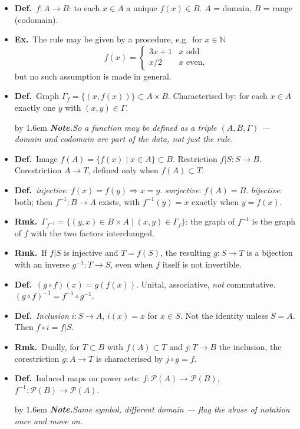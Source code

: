 \documentclass[12pt,a4paper]{article}
\newcommand{\Dfn}{\textbf{Def.}~}
\newcommand{\Exa}{\textbf{Ex.}~}
\newcommand{\Rmk}{\textbf{Rmk.}~}
\newcommand{\Cue}[1]{%
  \par\addvspace{7pt}\nopagebreak
  \begingroup
    \advance\leftskip by 1.6em
    \parindent=0pt \small\color{cue}%
    \textbf{\textit{Note.}}\enspace \textit{#1}\par
  \endgroup
  \addvspace{9pt}}
\newenvironment{BL}%
  {\begin{itemize}[leftmargin=1.4em,labelsep=0.55em,itemsep=11pt,topsep=11pt,parsep=0pt]}%
  {\end{itemize}}
\newcommand{\NN}{\mathbb{N}}
\newcommand{\Pow}{\mathcal{P}}
\newcommand{\imp}{\Rightarrow}
\begin{document}
\begin{BL}
\item \Dfn $f\colon A\to B$: to each $x\in A$ a unique $f(x)\in B$.
      $A$ = domain, $B$ = range (codomain).
\item \Exa The rule may be given by a procedure, e.g.\ for $x\in\NN$
      \[ f(x)=\begin{cases}3x+1 & x\text{ odd}\\ x/2 & x\text{ even,}\end{cases} \]
      but no such assumption is made in general.
\item \Dfn Graph $\Gamma_f=\{(x,f(x))\}\subset A\times B$.
      Characterised by: for each $x\in A$ exactly one $y$ with $(x,y)\in\Gamma$.
\Cue{So a function may be \emph{defined} as a triple $(A,B,\Gamma)$ --- domain and codomain are
part of the data, not just the rule.}
\item \Dfn Image $f(A)=\{f(x)\mid x\in A\}\subset B$.\quad
      Restriction $f|S\colon S\to B$.\quad
      Corestriction $A\to T$, defined only when $f(A)\subset T$.
\item \Dfn \emph{injective}: $f(x)=f(y)\imp x=y$.\quad
      \emph{surjective}: $f(A)=B$.\quad
      \emph{bijective}: both; then $f^{-1}\colon B\to A$ exists, with
      $f^{-1}(y)=x$ exactly when $y=f(x)$.
\item \Rmk $\Gamma_{f^{-1}}=\{(y,x)\in B\times A\mid(x,y)\in\Gamma_f\}$: the graph of $f^{-1}$
      is the graph of $f$ with the two factors interchanged.
\item \Rmk If $f|S$ is injective and $T=f(S)$, the resulting $g\colon S\to T$ is a bijection
      with an inverse $g^{-1}\colon T\to S$, even when $f$ itself is not invertible.
\item \Dfn $(g\circ f)(x)=g(f(x))$. Unital, associative, \emph{not} commutative.
      $(g\circ f)^{-1}=f^{-1}\circ g^{-1}$.
\item \Dfn \emph{Inclusion} $i\colon S\to A$, $i(x)=x$ for $x\in S$. Not the identity unless
      $S=A$. Then $f\circ i=f|S$.
\item \Rmk Dually, for $T\subset B$ with $f(A)\subset T$ and $j\colon T\to B$ the inclusion,
      the corestriction $g\colon A\to T$ is characterised by $j\circ g=f$.
\item \Dfn Induced maps on power sets:
      \(f\colon\Pow(A)\to\Pow(B)\),\quad \(f^{-1}\colon\Pow(B)\to\Pow(A)\).
\Cue{Same symbol, different domain --- flag the abuse of notation once and move on.}
\end{BL}
\end{document}
